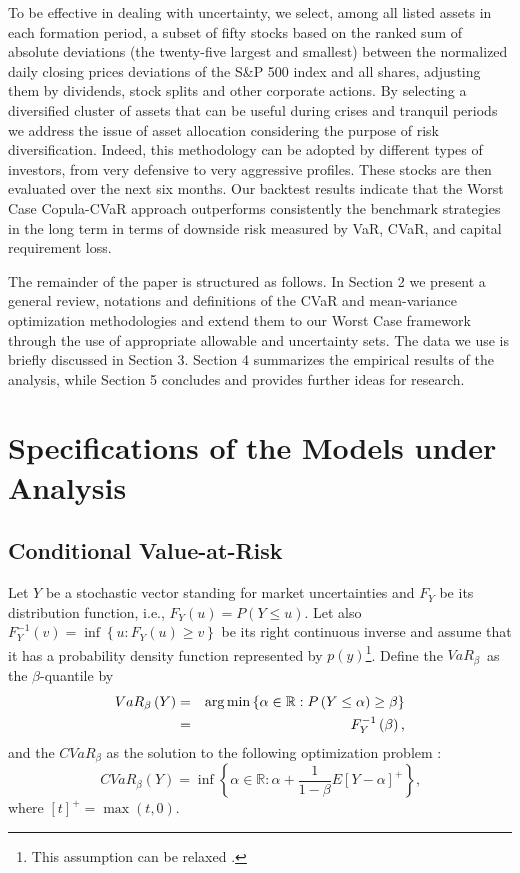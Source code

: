 \documentclass[a4paper,10pt]{article}
\begin{document}
To be effective in dealing with uncertainty, we select, among all listed assets in each formation period, a subset of fifty stocks based on the ranked sum of absolute deviations (the twenty-five largest and smallest) between the normalized daily closing prices deviations of the S\&P 500 index and all shares, adjusting them by dividends, stock splits and other corporate actions. By selecting a diversified cluster of assets that can be useful during crises and tranquil periods we address the issue of asset allocation considering the purpose of risk diversification. Indeed, this methodology can be adopted by different types of investors, from very defensive to very aggressive profiles. These stocks are then evaluated over the next six months. Our backtest results indicate that the Worst Case Copula-CVaR approach outperforms consistently the benchmark strategies in the long term in terms of downside risk measured by VaR, CVaR, and capital requirement loss. 

The remainder of the paper is structured as follows. In Section 2 we present a general review, notations and definitions of the CVaR and mean-variance optimization methodologies and extend them to our Worst Case framework through the use of appropriate allowable and uncertainty sets. The data we use is briefly discussed in Section 3. Section 4 summarizes the empirical results of the analysis, while Section 5 concludes and provides further ideas for research.

\section{Specifications of the Models under Analysis}

\subsection{Conditional Value-at-Risk}

 Let $Y$ be a stochastic vector standing for market uncertainties and $F_{Y}$ be its distribution function, i.e., $F_{Y}\left( u\right) =P\left( Y\leq u\right) $. Let also $F_{Y}^{-1}\left( v\right) =\inf \left\{ u:F_{Y}\left(u\right) \geq v\right\} $ be its right continuous inverse and assume that it has a probability density function represented by $p(y)$\footnote{This assumption can be relaxed \citep{uryasev2013}.}. Define the $VaR_{\beta }$\thinspace\ as the $\beta $-quantile by 
\begin{eqnarray}
VaR_{\beta }\left( Y\right) &=& \arg \min \left\{ \alpha \in\mathbb{R}:P\left( Y\leq \alpha \right) \geq \beta \right\}  \label{one} \\
&=&F_{Y}^{-1}\left( \beta \right) \text{,}  \notag
\end{eqnarray}
and the $CVaR_{\beta }$ as the solution to the following optimization problem \citep{pflug2000}:
\begin{equation}
CVaR_{\beta }\left( Y\right) =\inf \left\{ \alpha \in\mathbb{R}:\alpha +\frac{1}{1-\beta }E\left[ Y-\alpha \right] ^{+}\right\} \text{,}
\label{two}
\end{equation}
where $\left[ t\right] ^{+}=\max \left( t,0\right) $.
\end{document}
